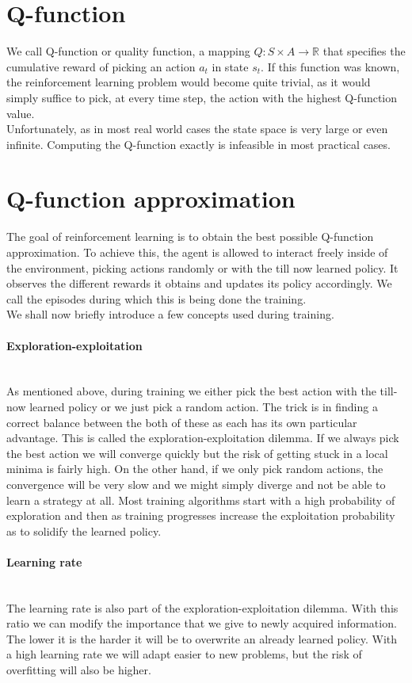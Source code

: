 \section{Q-function}
 We call Q-function or quality function, a mapping $Q:S \times A \rightarrow \mathbb{R}$ that specifies the cumulative reward of picking an action $a_t$ in state $s_t$. If this function was known, the reinforcement learning problem would become quite trivial, as it would simply suffice to pick, at every time step, the action with the highest Q-function value.\\
 Unfortunately, as in most real world cases the state space is very large or even infinite. Computing the Q-function exactly is infeasible in most practical cases.
 \section{Q-function approximation} 
The goal of reinforcement learning is to obtain the best possible Q-function approximation. To achieve this, the agent is allowed to interact freely inside of the environment, picking actions randomly or with the till now learned policy. It observes the different rewards it obtains and updates its policy accordingly. We call the episodes during which this is being done the training.\\ 
We shall now briefly introduce a few concepts used during training.
\paragraph{Exploration-exploitation} \mbox{}\\
As mentioned above, during training we either pick the best action with the till-now learned policy or we just pick a random action. The trick is in finding a correct balance between the both of these as each has its own particular advantage. This is called the exploration-exploitation dilemma\cite{yogeswaran2012reinforcement}. If we always pick the best action we will converge quickly but the risk of getting stuck in a local minima is fairly high. On the other hand, if we only pick random actions, the convergence will be very slow and we might simply diverge and not be able to learn a strategy at all. Most training algorithms start with a high probability of exploration and then as training progresses increase the exploitation probability as to solidify the learned policy.
\paragraph{Learning rate}\mbox{}\\
The learning rate is also part of the exploration-exploitation dilemma. With this ratio we can modify the importance that we give to newly acquired information. The lower it is the harder it will be to overwrite an already learned policy. With a high learning rate we will adapt easier to new problems, but the risk of overfitting will also be higher.

